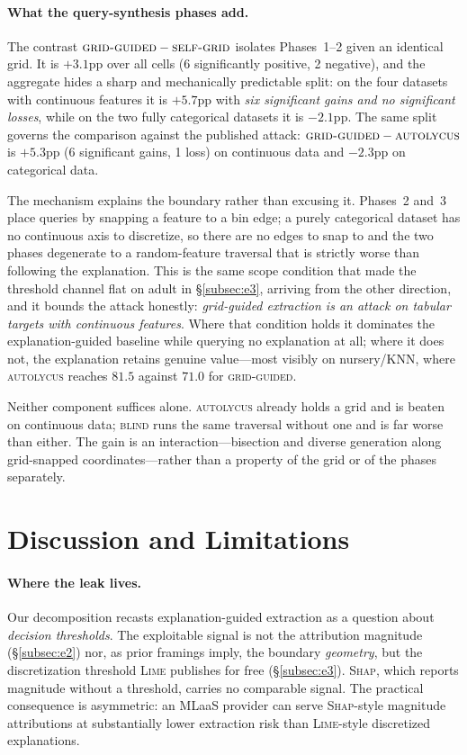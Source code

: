 \documentclass[sigconf,anonymous,review]{acmart}
\begin{document}
\paragraph{What the query-synthesis phases add.} The contrast
$\textsc{grid-guided}-\textsc{self-grid}$ isolates Phases~1--2 given an identical grid. It is
$+3.1$pp over all cells (6 significantly positive, 2 negative), and the aggregate hides a sharp and
mechanically predictable split: on the four datasets with continuous features it is $+5.7$pp with
\emph{six significant gains and no significant losses}, while on the two fully categorical datasets it
is $-2.1$pp. The same split governs the comparison against the published attack:
$\textsc{grid-guided}-\textsc{autolycus}$ is $+5.3$pp (6 significant gains, 1 loss) on continuous data
and $-2.3$pp on categorical data.

The mechanism explains the boundary rather than excusing it. Phases~2 and~3 place queries by snapping
a feature to a bin edge; a purely categorical dataset has no continuous axis to discretize, so there
are no edges to snap to and the two phases degenerate to a random-feature traversal that is strictly
worse than following the explanation. This is the same scope condition that made the threshold channel
flat on adult in \S\ref{subsec:e3}, arriving from the other direction, and it bounds the attack
honestly: \emph{grid-guided extraction is an attack on tabular targets with continuous features}. Where
that condition holds it dominates the explanation-guided baseline while querying no explanation at all;
where it does not, the explanation retains genuine value---most visibly on nursery/KNN, where
\textsc{autolycus} reaches $81.5$ against $71.0$ for \textsc{grid-guided}.

Neither component suffices alone. \textsc{autolycus} already holds a grid and is beaten on continuous
data; \textsc{blind} runs the same traversal without one and is far worse than either. The gain is an
interaction---bisection and diverse generation along grid-snapped coordinates---rather than a property
of the grid or of the phases separately.

\section{Discussion and Limitations}
\label{sec:discussion}
\paragraph{Where the leak lives.} Our decomposition recasts explanation-guided extraction as a
question about \emph{decision thresholds}. The exploitable signal is not the attribution magnitude
(\S\ref{subsec:e2}) nor, as prior framings imply, the boundary \emph{geometry}, but the discretization
threshold \textsc{Lime} publishes for free (\S\ref{subsec:e3}). \textsc{Shap}, which reports magnitude
without a threshold, carries no comparable signal. The practical consequence is asymmetric: an MLaaS
provider can serve \textsc{Shap}-style magnitude attributions at substantially lower extraction risk
than \textsc{Lime}-style discretized explanations.
\end{document}
